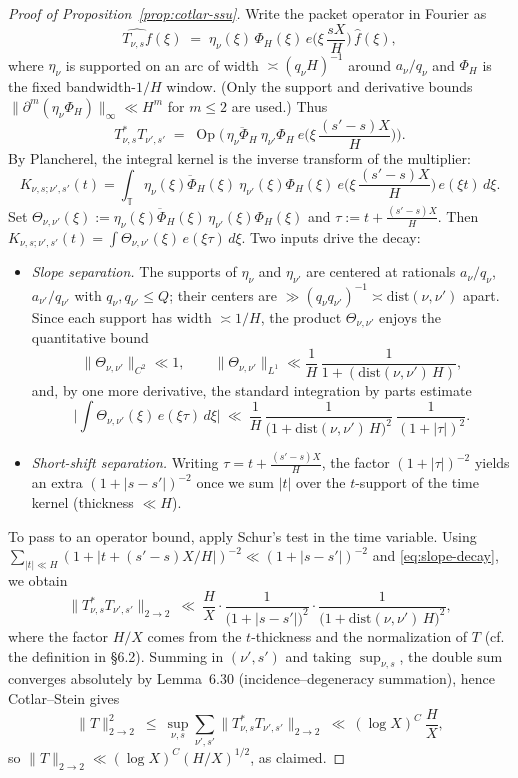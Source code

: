 \begin{proof}[Proof of Proposition~\ref{prop:cotlar-ssu}]
Write the packet operator in Fourier as
\[
\widehat{T_{\nu,s}f}(\xi)
\;=\;
\eta_\nu(\xi)\,\Phi_H(\xi)\,e\!\Big( \xi\,\frac{sX}{H}\Big)\,\widehat{f}(\xi),
\]
where $\eta_\nu$ is supported on an arc of width $\asymp (q_\nu H)^{-1}$ around $a_\nu/q_\nu$ and
$\Phi_H$ is the fixed bandwidth-$1/H$ window. (Only the support and derivative bounds
$\|\partial^m(\eta_\nu\Phi_H)\|_\infty\ll H^{m}$ for $m\le 2$ are used.) Thus
\[
T_{\nu,s}^{*}T_{\nu',s'}
\;=\;
\operatorname{Op}\!\Big(\, \overline{\eta_\nu\Phi_H}\ \eta_{\nu'}\Phi_H\ 
e\!\Big(\xi\,\frac{(s'-s)X}{H}\Big)\Big).
\]
By Plancherel, the integral kernel is the inverse transform of the multiplier:
\[
K_{\nu,s;\nu',s'}(t)
=
\int_{\mathbb T}
\overline{\eta_\nu(\xi)\Phi_H(\xi)}\ \eta_{\nu'}(\xi)\Phi_H(\xi)\ 
e\!\Big(\xi\,\frac{(s'-s)X}{H}\Big)\,e(\xi t)\,d\xi.
\]
Set $\Theta_{\nu,\nu'}(\xi):=\overline{\eta_\nu(\xi)\Phi_H(\xi)}\,\eta_{\nu'}(\xi)\Phi_H(\xi)$ and
$\tau:=t+\frac{(s'-s)X}{H}$. Then $K_{\nu,s;\nu',s'}(t)=\int \Theta_{\nu,\nu'}(\xi)\,e(\xi\tau)\,d\xi$.
Two inputs drive the decay:
\begin{itemize}
\item \emph{Slope separation.} The supports of $\eta_\nu$ and $\eta_{\nu'}$ are centered at rationals
$a_\nu/q_\nu$, $a_{\nu'}/q_{\nu'}$ with $q_\nu,q_{\nu'}\le Q$; their centers are $\gg (q_\nu q_{\nu'})^{-1}
\asymp \mathrm{dist}(\nu,\nu')$ apart. Since each support has width $\asymp 1/H$, the product
$\Theta_{\nu,\nu'}$ enjoys the quantitative bound
\[
\|\Theta_{\nu,\nu'}\|_{C^2}
\ll 1,\qquad
\|\Theta_{\nu,\nu'}\|_{L^1}\ll \frac{1}{H}\,\frac{1}{1+(\mathrm{dist}(\nu,\nu')\,H)},
\]
and, by one more derivative, the standard integration by parts estimate
\begin{equation}\label{eq:slope-decay}
\Big|\int \Theta_{\nu,\nu'}(\xi)\,e(\xi \tau)\,d\xi\Big|
\ \ll\ \frac{1}{H}\,\frac{1}{\big(1+\mathrm{dist}(\nu,\nu')\,H\big)^{2}}\ \frac{1}{(1+|\tau|)^{2}}.
\end{equation}
\item \emph{Short-shift separation.} Writing $\tau=t+\frac{(s'-s)X}{H}$, the factor
$(1+|\tau|)^{-2}$ yields an extra $(1+|s-s'|)^{-2}$ once we sum $|t|$ over the $t$-support of the
time kernel (thickness $\ll H$).
\end{itemize}
To pass to an operator bound, apply Schur’s test in the time variable. Using
$\sum_{|t|\ll H}(1+|t+(s'-s)X/H|)^{-2}\ll (1+|s-s'|)^{-2}$ and \eqref{eq:slope-decay}, we obtain
\[
\|T_{\nu,s}^{*}T_{\nu',s'}\|_{2\to2}
\ \ll\ 
\frac{H}{X}\cdot
\frac{1}{\big(1+|s-s'|\big)^{2}}\cdot
\frac{1}{\big(1+\mathrm{dist}(\nu,\nu')\,H\big)^{2}},
\]
where the factor $H/X$ comes from the $t$-thickness and the normalization of $T$ (cf. the
definition in \S6.2). Summing in $(\nu',s')$ and taking $\sup_{\nu,s}$,
the double sum converges absolutely by Lemma~6.30 (incidence–degeneracy summation), hence
Cotlar–Stein gives
\[
\|T\|_{2\to2}^2
\ \le\
\sup_{\nu,s}\sum_{\nu',s'}\|T_{\nu,s}^{\ast}T_{\nu',s'}\|_{2\to2}
\ \ll\ (\log X)^C\ \frac{H}{X},
\]
so $\|T\|_{2\to2}\ll (\log X)^C(H/X)^{1/2}$, as claimed.
\end{proof}


